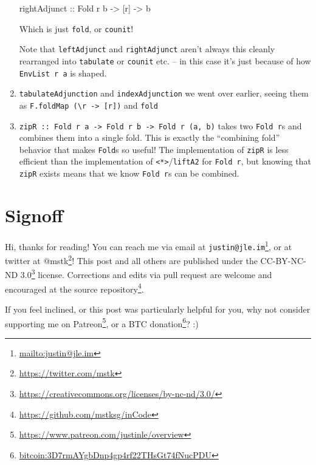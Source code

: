 \documentclass[]{article}
\newenvironment{Shaded}{}{}
\newcommand{\DataTypeTok}[1]{\textcolor[rgb]{0.56,0.13,0.00}{#1}}
\newcommand{\NormalTok}[1]{#1}
\newcommand{\OtherTok}[1]{\textcolor[rgb]{0.00,0.44,0.13}{#1}}
\renewcommand{\href}[2]{#2\footnote{\url{#1}}}
\begin{document}
\begin{enumerate}
\begin{Shaded}
\begin{Highlighting}[]
\OtherTok{rightAdjunct\textquotesingle{} ::} \DataTypeTok{Fold}\NormalTok{ r b }\OtherTok{{-}>}\NormalTok{ [r] }\OtherTok{{-}>}\NormalTok{ b}
\end{Highlighting}
\end{Shaded}

  Which is just \texttt{fold}, or \texttt{counit}!

  Note that \texttt{leftAdjunct} and \texttt{rightAdjunct} aren't always this
  cleanly rearranged into \texttt{tabulate} or \texttt{counit} etc. -- in this
  case it's just because of how \texttt{EnvList\ r\ a} is shaped.
\item
  \texttt{tabulateAdjunction} and \texttt{indexAdjunction} we went over earlier,
  seeing them as
  \texttt{F.foldMap\ (\textbackslash{}r\ -\textgreater{}\ {[}r{]})} and
  \texttt{fold}
\item
  \texttt{zipR\ ::\ Fold\ r\ a\ -\textgreater{}\ Fold\ r\ b\ -\textgreater{}\ Fold\ r\ (a,\ b)}
  takes two \texttt{Fold\ r}s and combines them into a single fold. This is
  exactly the ``combining fold'' behavior that makes \texttt{Fold}s so useful!
  The implementation of \texttt{zipR} is less efficient than the implementation
  of \texttt{\textless{}*\textgreater{}}/\texttt{liftA2} for \texttt{Fold\ r},
  but knowing that \texttt{zipR} exists means that we know \texttt{Fold\ r}s can
  be combined.
\end{enumerate}

\hypertarget{signoff}{%
\section{Signoff}\label{signoff}}

Hi, thanks for reading! You can reach me via email at
\href{mailto:justin@jle.im}{\nolinkurl{justin@jle.im}}, or at twitter at
\href{https://twitter.com/mstk}{@mstk}! This post and all others are published
under the \href{https://creativecommons.org/licenses/by-nc-nd/3.0/}{CC-BY-NC-ND
3.0} license. Corrections and edits via pull request are welcome and encouraged
at \href{https://github.com/mstksg/inCode}{the source repository}.

If you feel inclined, or this post was particularly helpful for you, why not
consider \href{https://www.patreon.com/justinle/overview}{supporting me on
Patreon}, or a \href{bitcoin:3D7rmAYgbDnp4gp4rf22THsGt74fNucPDU}{BTC donation}?
:)
\end{document}
